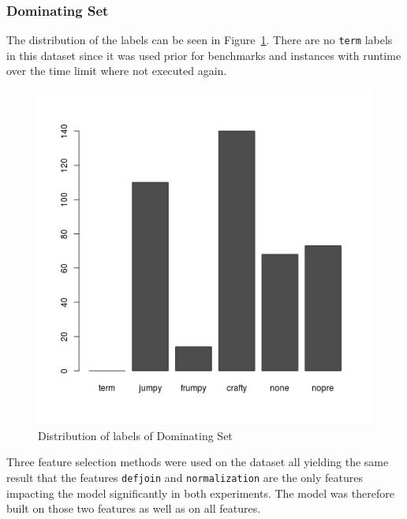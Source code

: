 \subsubsection{Dominating Set}
The distribution of the labels can be seen in Figure~\ref{fig:dsLabelsE1}. There are no \lstinline$term$ labels in this dataset since it was used prior for benchmarks and instances with runtime over the time limit where not executed again.
\begin{figure}[h]
	\center
	\includegraphics[scale=0.4]{figures/domsetLabelsE1.png}
	\caption{Distribution of labels of Dominating Set\label{fig:dsLabelsE1}}
\end{figure}
\par Three feature selection methods were used on the dataset all yielding the same result that the features \lstinline$defjoin$ and \lstinline$normalization$ are the only features impacting the model significantly in both experiments. The model was therefore built on those two features as well as on all features.

